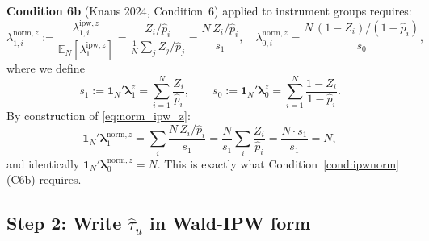 \documentclass[12pt, a4paper]{article}
\theoremstyle{condstyle}
\theoremstyle{plain}
\newcommand{\EN}{\mathbb{E}_N}
\newcommand{\bone}{\mathbf{1}_N}
\newcommand{\phat}{\hat{p}}
\begin{document}
\medskip\noindent
\textbf{Condition 6b} (Knaus 2024, Condition~6) applied to instrument groups requires:
\begin{equation}
  \lambda_{1,i}^{\mathrm{norm},z}
    := \frac{\lambda_{1,i}^{\mathrm{ipw},z}}{\EN[\lambda_1^{\mathrm{ipw},z}]}
     = \frac{Z_i/\phat_i}{\frac{1}{N}\sum_j Z_j/\phat_j}
     = \frac{N\,Z_i/\phat_i}{s_1},
  \quad
  \lambda_{0,i}^{\mathrm{norm},z}
    = \frac{N\,(1-Z_i)/(1-\phat_i)}{s_0},
  \label{eq:norm_ipw_z}
\end{equation}
where we define
\begin{equation}
  s_1 := \bone'\boldsymbol{\lambda}_1^z = \sum_{i=1}^N \frac{Z_i}{\phat_i},
  \qquad
  s_0 := \bone'\boldsymbol{\lambda}_0^z = \sum_{i=1}^N \frac{1-Z_i}{1-\phat_i}.
  \label{eq:s1s0}
\end{equation}
By construction of \eqref{eq:norm_ipw_z}:
\begin{equation}
  \bone'\boldsymbol{\lambda}_1^{\mathrm{norm},z}
  = \sum_i \frac{N\,Z_i/\phat_i}{s_1}
  = \frac{N}{s_1}\sum_i \frac{Z_i}{\phat_i}
  = \frac{N \cdot s_1}{s_1} = N,
  \label{eq:c6b_sum}
\end{equation}
and identically $\bone'\boldsymbol{\lambda}_0^{\mathrm{norm},z} = N$.
This is exactly what Condition~\ref{cond:ipwnorm}(C6b) requires.

\subsection{Step 2: Write \texorpdfstring{$\hat\tau_u$}{tau\_u} in Wald-IPW form}
\label{ssec:u_step2}
\end{document}
